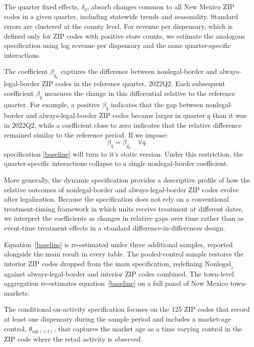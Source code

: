 \documentclass[english,12pt]{article}
\begin{document}
The quarter fixed effects, \(\delta_q\), absorb changes common to all New Mexico ZIP codes in a given quarter, including statewide trends and seasonality. Standard errors are clustered at the county level. For revenue per dispensary, which is defined only for ZIP codes with positive store counts, we estimate the analogous specification using log revenue per dispensary and the same quarter-specific interactions.


The coefficient \(\beta_{q_0}\) captures the difference between nonlegal-border and always-legal-border ZIP codes in the reference quarter, 2022Q2. Each subsequent coefficient \(\beta_q\) measures the change in this differential relative to the reference quarter. For example, a positive \(\beta_q\) indicates that the gap between nonlegal-border and always-legal-border ZIP codes became larger in quarter \(q\) than it was in 2022Q2, while a coefficient close to zero indicates that the relative difference remained similar to the reference period. If we impose: \[\beta_q=\beta_{q_0}\quad \forall q.\] specification \ref{baseline} will turn to it's static version.
Under this restriction, the quarter-specific interactions collapse to a single nonlegal-border coefficient.

More generally, the dynamic specification provides a descriptive profile of how the relative outcomes of nonlegal-border and always-legal-border ZIP codes evolve after legalization. Because the specification does not rely on a conventional treatment-timing framework in which units receive treatment at different dates, we interpret the coefficients as changes in relative gaps over time rather than as event-time treatment effects in a standard difference-in-differences design.


Equation~\eqref{baseline} is re-estimated under three additional samples, reported alongside the main result in every table. The pooled-control sample restores the interior ZIP codes dropped from the main specification, redefining $\text{Nonlegal}_z$ against always-legal-border and interior ZIP codes combined. The town-level aggregation re-estimates equation~\eqref{baseline} on a full panel of New Mexico town-markets. 

The conditional-on-activity specification focuses on the 125 ZIP codes that record at least one dispensary during the sample period and includes a market-age control, $\theta_{\text{age}(z,t)}$, that captures the market age as a time varying control in the ZIP code where the retail activity is observed.  
\end{document}
